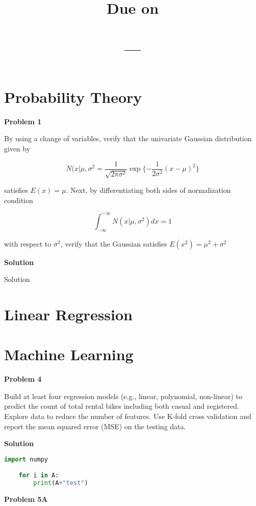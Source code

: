 \documentclass{article}
\title{
    \Title \\
    \vspace{2mm}
    \large
    Due on \DueDate \\
    \ClassName \\ 
    \ClassNumber ---\ClassSection \\
    \Instructor
}
\author{\Author}
\date{}
\newenvironment{problem}[1][]{
    \textbf{Problem #1}\\
    \linebreak
}{
    \vspace{4mm}
}
\newenvironment{solution}{
    \textbf{Solution} \\
    \linebreak
}{
    \vspace{4mm}
}
\begin{document}
\maketitle
\thispagestyle{empty}

\section*{Probability Theory}

\begin{problem}[1]
    By using a change of variables, verify that the univariate Gaussian distribution given by

    \begin{equation}
        N(x|\mu,\sigma^2= \frac{1}{\sqrt{2\pi\sigma^2}} \exp{
            \{
            -\frac{1}{2\sigma^2}
            (x-\mu)^2
            \}
        }
    \end{equation}
    
    satisfies $E(x) = \mu$. Next, by differentiating both sides of normalization condition
    
    \begin{equation}
        \int_{-\infty}^{-\infty} N(x|\mu,\sigma^2) dx = 1
    \end{equation}
    
    with respect to $\sigma^2$, verify that the Gaussian satisfies $E(x^2) = \mu^2+\sigma^2$    
\end{problem}

\begin{solution}
    Solution
\end{solution}

\section*{Linear Regression}


\newpage
\section*{Machine Learning}

\begin{problem}[4]
    Build at least four regression models (e.g., linear, polynomial, non-linear) to predict the count of total rental bikes including both casual and registered. Explore data to reduce the number of features. Use K-fold cross validation and report the mean squared error (MSE) on the testing data.
\end{problem}

\begin{solution}

    \begin{lstlisting}[language=Python]
    import numpy

    for i in A:
        print(A+"test")
    \end{lstlisting}

\end{solution}

\begin{problem}[5A]

\end{problem}
\end{document}
